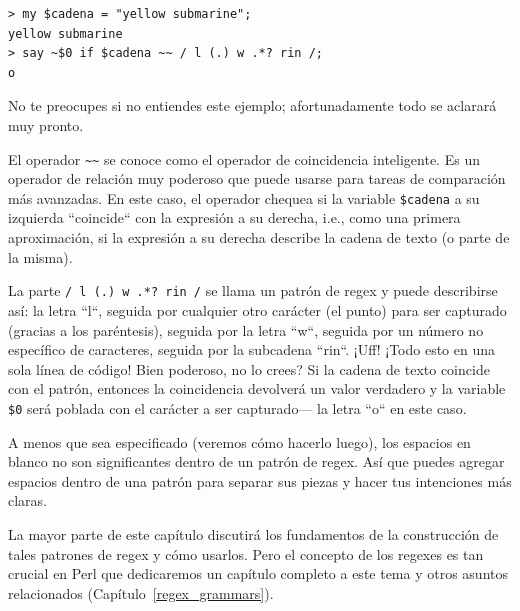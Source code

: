 \begin{verbatim}
> my $cadena = "yellow submarine";
yellow submarine
> say ~$0 if $cadena ~~ / l (.) w .*? rin /;
o
\end{verbatim}

No te preocupes si no entiendes este ejemplo;
afortunadamente todo se aclarará muy pronto.

El operador \verb|~~| se conoce como el operador de coincidencia
inteligente. Es un operador de relación muy poderoso que puede
usarse para tareas de comparación más avanzadas. En este caso, 
el operador chequea si la variable {\tt \$cadena} a su izquierda
``coincide`` con la expresión a su derecha, i.e., como una 
primera aproximación, si la expresión a su derecha describe la 
cadena de texto (o parte de la misma).

La parte \verb|/ l (.) w .*? rin /| se llama un patrón de regex y puede
describirse así: la letra ``l``, seguida por cualquier otro carácter (el
punto) para ser capturado (gracias a los paréntesis), seguida por la
letra ``w``, seguida por un número no específico de caracteres,
seguida por la subcadena ``rin``. ¡Uff! ¡Todo esto en una sola línea
de código! Bien poderoso, no lo crees? Si la cadena de texto coincide 
con el patrón, entonces la coincidencia devolverá un valor verdadero y 
la variable \verb|$0| será poblada con el carácter a ser capturado---
la letra ``o`` en este caso.

A menos que sea especificado (veremos cómo hacerlo luego),
los espacios en blanco no son significantes dentro de un 
patrón de regex. Así que puedes agregar espacios dentro de una patrón
para separar sus piezas y hacer tus intenciones más claras.

La mayor parte de este capítulo discutirá los fundamentos de 
la construcción de tales patrones de regex y cómo usarlos. 
Pero el concepto de los regexes es tan crucial en Perl que 
dedicaremos un capítulo completo a este tema y otros asuntos
relacionados (Capítulo~\ref{regex_grammars}).

